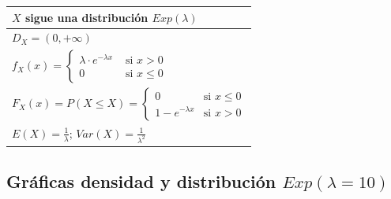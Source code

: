 \documentclass[
  letterpaper,
  DIV=11,
  numbers=noendperiod]{scrreprt}
\begin{document}
\renewcommand{\arraystretch}{2}
\begin{table}
\centering
\begin{tabular}{|l|}
\hline\rowcolor{LightBlue}
$X$ sigue una distribución $Exp(\lambda)$
\\\hline
$D_X=(0,+\infty)$ \\\hline
$f_{X}(x)=\left\{\begin{array}{ll} \lambda\cdot e^{-\lambda x} & \mbox{ si } x>0\\ 0 & \mbox{ si } x\leq 0 \end{array}\right.$
\\\hline
$F_X(x)=P(X\leq X)= \left\{\begin{array}{ll} 0 &\mbox{si } x\leq 0\\1-e^{-\lambda x}& \mbox{si } x>0\end{array}\right.$
\\\hline
$E(X)=\frac{1}{\lambda}$; $Var(X)=\frac{1}{\lambda^2}$
\\\hline
\end{tabular}
\end{table}

\subsection{\texorpdfstring{Gráficas densidad y distribución
\(Exp(\lambda=10)\)}{Gráficas densidad y distribución Exp(\textbackslash lambda=10)}}\label{gruxe1ficas-densidad-y-distribuciuxf3n-explambda10}
\end{document}
